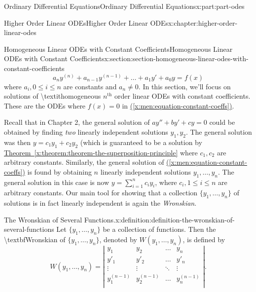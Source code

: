 \documentclass[oneside,10pt,]{book}
\newcommand{\xreffont}{\relax}
\numberwithin{equation}{part}
\renewcommand{\th}{\text{th}}
\newcommand{\amp}{&}
\begin{document}
\begin{partptx}{Ordinary Differential Equations}{}{Ordinary Differential Equations}{}{}{x:part:part-odes}
\begin{chapterptx}{Higher Order Linear ODEs}{}{Higher Order Linear ODEs}{}{}{x:chapter:higher-order-linear-odes}
\begin{sectionptx}{Homogeneous Linear ODEs with Constant Coefficients}{}{Homogeneous Linear ODEs with Constant Coefficients}{}{}{x:section:section-homogeneous-linear-odes-with-constant-coefficients}
\begin{equation}
a_{n}y^{(n)}+a_{n-1}y^{(n-1)}+\dots+a_{1}y'+a_{0}y=f(x)\label{x:men:equation-constant-coeffs}
\end{equation}
where \(a_{i},0\leq i\leq n\) are constants and \(a_{n}\neq0\). In this section, we'll focus on solutions of \textbackslash{}textit\textbraceleft{}homogeneous\textbraceright{} \(n^{\th}\) order linear ODEs with constant coefficients. These are the ODEs where \(f(x) = 0\) in \hyperref[x:men:equation-constant-coeffs]{({\xreffont\ref{x:men:equation-constant-coeffs}})}.%
\par
Recall that in Chapter 2, the general solution of \(ay''+by'+cy=0\) could be obtained by finding \emph{two} linearly independent solutions \(y_{1},y_{2}\). The general solution was then \(y = c_{1}y_{1}+c_{2}y_{2}\) (which is guaranteed to be a solution by \hyperref[x:theorem:theorem-the-superposition-principle]{Theorem~{\xreffont\ref{x:theorem:theorem-the-superposition-principle}}} where \(c_{1},c_{2}\) are arbitrary constants. Similarly, the general solution of \hyperref[x:men:equation-constant-coeffs]{({\xreffont\ref{x:men:equation-constant-coeffs}})} is found by obtaining \(n\) linearly independent solutions \(y_{1},\dots,y_{n}\). The general solution in this case is now \(y = \sum_{i=1}^{n}c_{i}y_{i}\), where \(c_{i},1\leq i\leq n\) are arbitrary constants. Our main tool for showing that a collection \(\{y_{1},\dots,y_{n}\}\) of solutions is in fact linearly independent is again the \emph{Wronskian}.%
\begin{definition}{The Wronskian of Several Functions.}{x:definition:definition-the-wronskian-of-several-functions}%
%
 Let \(\{y_{1},\dots,y_{n}\}\) be a collection of functions. Then the \textbackslash{}textbf\textbraceleft{}Wronskian\textbraceright{} of \(\{y_{1},\dots,y_{n}\}\), denoted by \(W(y_{1},\dots,y_{n})\), is defined by%
\begin{equation*}
W(y_{1},\dots,y_{n}) = \left|\begin{array}{cccc}
y_{1} \amp y_{2} \amp \dots   \amp y_{n}   \\
y'_{1}  \amp y'_{2}  \amp \dots   \amp y'_{n}  \\
\vdots  \amp \vdots  \amp \ddots  \amp \vdots  \\
y^{(n-1)}_{1} \amp y^{(n-1)}_{2} \amp \dots   \amp y^{(n-1)}_{n} \\
\end{array}\right|.
\end{equation*}

\end{definition}
\end{sectionptx}
\end{chapterptx}
\end{partptx}
\end{document}
